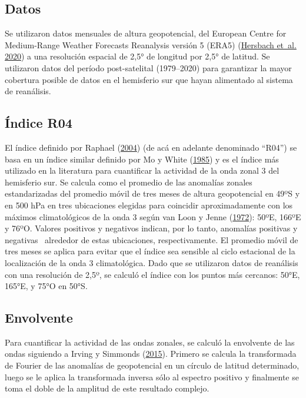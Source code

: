 \documentclass[12pt,oneside,a4paper]{reedthesis}
\begin{document}
\hypertarget{datos}{%
\subsection{Datos}\label{datos}}

Se utilizaron datos mensuales de altura geopotencial, del European Centre for Medium-Range Weather Forecasts Reanalysis versión 5 (ERA5) (\protect\hyperlink{ref-hersbach2020}{Hersbach et~al. 2020}) a una resolución espacial de 2,5° de longitud por 2,5° de latitud.
Se utilizaron datos del período post-satelital (1979--2020) para garantizar la mayor cobertura posible de datos en el hemisferio sur que hayan alimentado al sistema de reanálisis.

\hypertarget{uxedndice-r04}{%
\subsection{Índice R04}\label{uxedndice-r04}}

El índice definido por Raphael (\protect\hyperlink{ref-raphael2004}{2004}) (de acá en adelante denominado ``R04'') se basa en un índice similar definido por Mo y White (\protect\hyperlink{ref-mo1985}{1985}) y es el índice más utilizado en la literatura para cuantificar la actividad de la onda zonal 3 del hemisferio sur.
Se calcula como el promedio de las anomalías zonales estandarizadas del promedio móvil de tres meses de altura geopotencial en 49ºS y en 500 hPa en tres ubicaciones elegidas para coincidir aproximadamente con los máximos climatológicos de la onda 3 según van Loon y Jenne (\protect\hyperlink{ref-vanloon1972}{1972}): 50ºE, 166ºE y 76ºO.
Valores positivos y negativos indican, por lo tanto, anomalías positivas y negativas~ alrededor de estas ubicaciones, respectivamente.
El promedio móvil de tres meses se aplica para evitar que el índice sea sensible al ciclo estacional de la localización de la onda 3 climatológica.
Dado que se utilizaron datos de reanálisis con una resolución de 2,5º, se calculó el índice con los puntos más cercanos: 50°E, 165°E, y 75°O en 50°S.

\hypertarget{envolvente}{%
\subsection{Envolvente}\label{envolvente}}

Para cuantificar la actividad de las ondas zonales, se calculó la envolvente de las ondas siguiendo a Irving y Simmonds (\protect\hyperlink{ref-irving2015}{2015}).
Primero se calcula la transformada de Fourier de las anomalías de geopotencial en un círculo de latitud determinado, luego se le aplica la transformada inversa sólo al espectro positivo y finalmente se toma el doble de la amplitud de este resultado complejo.
\end{document}

